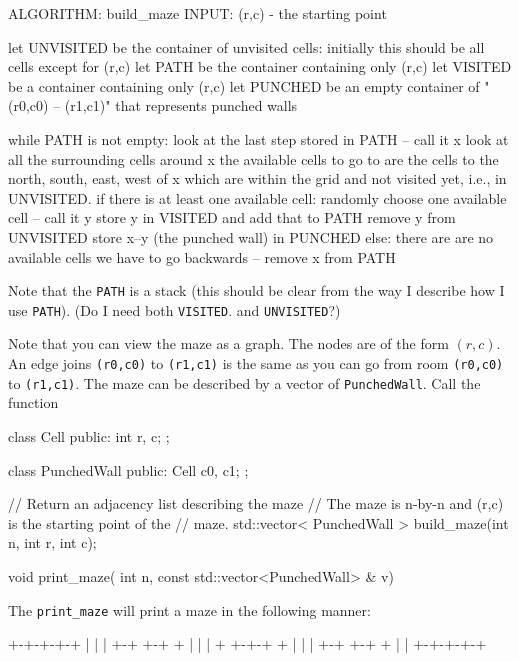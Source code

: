 \begin{console}
ALGORITHM: build_maze
INPUT: (r,c) - the starting point

let UNVISITED be the container of unvisited cells:
    initially this should be all cells except for (r,c)
let PATH be the container containing only (r,c)
let VISITED be a container containing only (r,c)
let PUNCHED be an empty container of "(r0,c0) -- (r1,c1)"
    that represents punched walls

while PATH is not empty:
    look at the last step stored in PATH -- call it x
    look at all the surrounding cells around x
    the available cells to go to are the
        cells to the north, south, east, west of x
        which are within the grid and not visited yet,
        i.e., in UNVISITED.
    if there is at least one available cell:
        randomly choose one available cell -- call it y
        store y in VISITED and add that to PATH
        remove y from UNVISITED
        store x--y (the punched wall) in PUNCHED
    else:
        there are are no available cells
        we have to go backwards -- remove x from PATH 
\end{console}
Note that the \texttt{PATH} is a stack
(this should be clear from the way I describe how I use
\texttt{PATH}).
(Do I need both  \texttt{VISITED}.
and \texttt{UNVISITED}?)

Note that you can view the maze as a graph.
The nodes are of the form $(r,c)$.
An edge joins \texttt{(r0,c0)} to
\texttt{(r1,c1)} is the same as you can go from
room \texttt{(r0,c0)} to \texttt{(r1,c1)}.
The maze can be described by a vector of \texttt{PunchedWall}. 
Call the function
\begin{console}
class Cell
{
public:
    int r, c;
};

class PunchedWall
{
public:
    Cell c0, c1;
};
  
// Return an adjacency list describing the maze
// The maze is n-by-n and (r,c) is the starting point of the
// maze.
std::vector< PunchedWall > build_maze(int n,
                                      int r, int c);

void print_maze( int n, const std::vector<PunchedWall> & v)
\end{console}
The \verb!print_maze! will print a maze in the following manner:
\begin{console}
+-+-+-+-+
|   |   |
+-+ +-+ +
| |     |
+ +-+-+ +
|     | |
+-+ +-+ +
|       |
+-+-+-+-+
\end{console}
